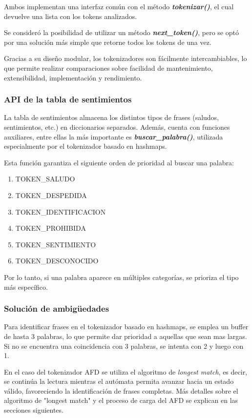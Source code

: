 Ambos implementan una interfaz común con el método \textbf{\textit{tokenizar()}}, el cual
devuelve una lista con los tokens analizados.

Se consideró la posibilidad de utilizar un método \textbf{\textit{next\_token()}}, pero se optó
por una solución más simple que retorne todos los tokens de una vez.

Gracias a su diseño modular, los tokenizadores son fácilmente intercambiables, lo que permite
realizar comparaciones sobre facilidad de mantenimiento, extensibilidad, implementación y
rendimiento.

\subsubsection{API de la tabla de sentimientos}
La tabla de sentimientos almacena los distintos tipos de frases (saludos, sentimientos, etc.)
en diccionarios separados. Además, cuenta con funciones auxiliares, entre ellas la más
importante es \textbf{\textit{buscar\_palabra()}}, utilizada especialmente por el tokenizador
basado en hashmaps.

Esta función garantiza el siguiente orden de prioridad al buscar una palabra:

\begin{enumerate}
	\item \footnotesize{TOKEN\_SALUDO}
	\item \footnotesize{TOKEN\_DESPEDIDA}
	\item \footnotesize{TOKEN\_IDENTIFICACION}
	\item \footnotesize{TOKEN\_PROHIBIDA}
	\item \footnotesize{TOKEN\_SENTIMIENTO}
	\item \footnotesize{TOKEN\_DESCONOCIDO}
\end{enumerate}

Por lo tanto, si una palabra aparece en múltiples categorías, se prioriza el tipo más
específico.

\subsubsection{Solución de ambigüedades}
Para identificar frases en el tokenizador basado en hashmaps, se emplea un buffer de hasta 3
palabras, lo que permite dar prioridad a aquellas que sean mas largas. Si no se encuentra una
coincidencia con 3 palabras, se intenta con 2 y luego con 1.

En el caso del tokenizador AFD se utiliza el algoritmo de \textit{longest match}, es decir, se
continúa la lectura mientras el autómata permita avanzar hacia un estado válido, favoreciendo
la identificación de frases completas. Más detalles sobre el algoritmo de "longest match" y el
proceso de carga del AFD se explican en las secciones siguientes.

